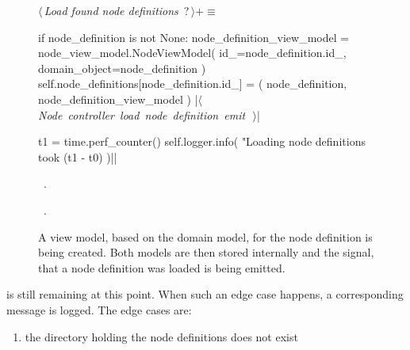 \documentclass[%
    a4paper,    %
    justified,  %
    nobib,      %
    openany     %
]{tufte-book}
\makeatletter
\renewcommand{\label}[1]{\@tufte@label{##1}}%
\makeatother
\begin{document}
\begin{figure}[!h]
  \begin{flushleft} \small
\begin{minipage}{\linewidth}\label{scrap8}\raggedright\small
{} $\langle\,${\itshape Load found node definitions}\nobreak\ {\footnotesize {?}}$\,\rangle+\equiv$
\vspace{-1ex}
\begin{pythoncode}
    if node_definition is not None:
        node_definition_view_model = node_view_model.NodeViewModel(
            id_=node_definition.id_,
            domain_object=node_definition
        )
        self.node_definitions[node_definition.id_] = (
            node_definition,
            node_definition_view_model
        )
        |\hbox{$\langle\,${\itshape Node controller load node definition emit}\nobreak\ {\footnotesize {}}$\,\rangle$}|

t1 = time.perf_counter()
self.logger.info(
    "Loading node definitions took %
    (t1 - t0)
)|\NWsep|
\end{pythoncode}
\vspace{1.5ex}
\footnotesize
\begin{list}{}{\setlength{\itemsep}{-\parsep}\setlength{\itemindent}{-\leftmargin}}
\item \NWtxtMacroDefBy\ .
\item \NWtxtMacroRefIn\ .

\item{}
\end{list}
\end{minipage}\vspace{4ex}
\end{flushleft}
\caption{A view model, based on the domain model, for the node definition is
    being created. Both models are then stored internally and the signal, that a
    node definition was loaded is being emitted.}
  \label{lst:nodes-controller-load-node-defs-2}
\end{figure}

\newpage{}

 is still remaining at this
point. When such an edge case happens, a corresponding message is logged. The
edge cases are:

\begin{enumerate}
  \item the directory holding the node definitions does not exist
\end{enumerate}
\end{document}
